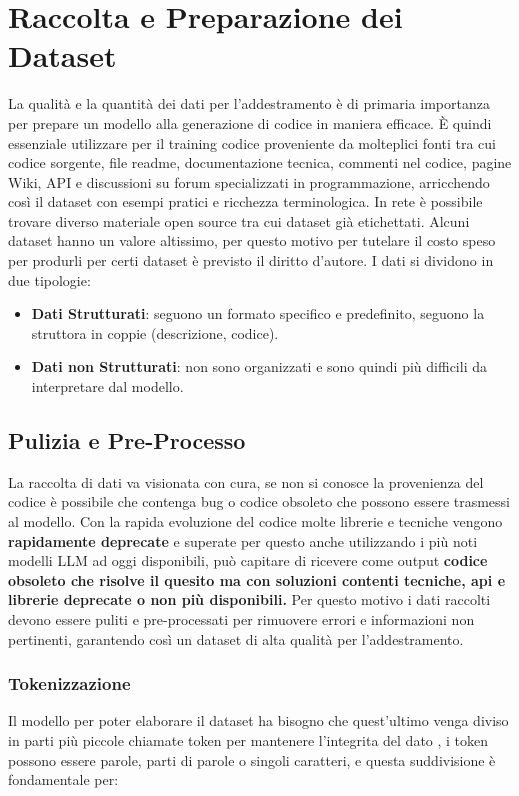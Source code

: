 \documentclass[12pt,a4paper,openright,twoside]{book}
\begin{document}
\section{Raccolta e Preparazione dei Dataset}
La qualità e la quantità dei dati per l'addestramento è di primaria importanza per prepare un modello alla generazione di codice in maniera efficace.
È quindi essenziale utilizzare per il training codice proveniente da molteplici fonti tra cui codice sorgente, file readme, documentazione tecnica, commenti nel codice,
pagine Wiki, API e discussioni su forum specializzati in programmazione, arricchendo così il dataset con esempi pratici e ricchezza terminologica.
In rete è possibile trovare diverso materiale open source tra cui dataset già etichettati.
Alcuni dataset hanno un valore altissimo, per questo motivo per tutelare il costo speso per produrli per certi dataset è previsto il diritto d'autore.
I dati si dividono in due tipologie:
\begin{itemize}
    \item \textbf{Dati Strutturati}: seguono un formato specifico e predefinito, seguono la struttora in coppie (descrizione, codice).
    \item \textbf{Dati non Strutturati}: non sono organizzati e sono quindi più difficili da interpretare dal modello. 
\end{itemize}
\subsection{Pulizia e Pre-Processo}
La raccolta di dati va visionata con cura, se non si conosce la provenienza del codice è possibile che contenga bug o codice obsoleto che possono essere trasmessi al modello.
Con la rapida evoluzione del codice molte librerie e tecniche vengono \textbf{rapidamente deprecate} e superate per questo anche utilizzando i più noti modelli LLM ad oggi disponibili, può capitare di ricevere come output \textbf{codice obsoleto che risolve il quesito ma con soluzioni contenti tecniche, api e librerie deprecate o non più disponibili.}
Per questo motivo i dati raccolti devono essere puliti e pre-processati per rimuovere errori e informazioni non pertinenti, garantendo così un dataset di alta qualità per l'addestramento.
\subsubsection{Tokenizzazione}
Il modello per poter elaborare il dataset ha bisogno che quest'ultimo venga diviso in parti più piccole chiamate token per mantenere l'integrita del dato \cite{stanford-codegen},
i token possono essere parole, parti di parole o singoli caratteri, e questa suddivisione è fondamentale per:
\end{document}
